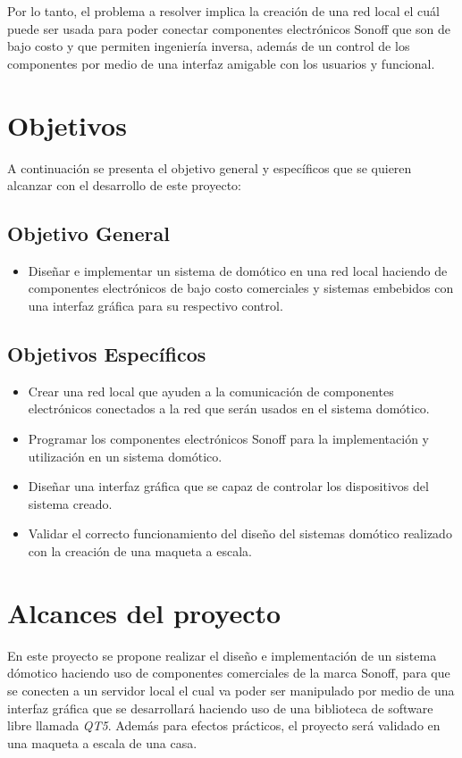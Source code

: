 Por lo tanto, el problema a resolver implica la creación de una red local el cuál puede ser usada para poder conectar componentes electrónicos Sonoff que son de bajo costo y que permiten ingeniería inversa, además de un control de los componentes por medio de una interfaz amigable con los usuarios y funcional.

\section{Objetivos}
A continuación se presenta el objetivo general y específicos que se quieren alcanzar con el desarrollo de este proyecto:

\subsection*{Objetivo General}
\begin{itemize}
\item Diseñar e implementar un sistema de domótico en una red local haciendo de componentes electrónicos de bajo costo comerciales y sistemas embebidos con una interfaz gráfica para su respectivo control.
\end{itemize}
\subsection*{Objetivos Específicos} 
\begin{itemize}
\item Crear una red local que ayuden a la comunicación de componentes electrónicos conectados a la red que serán usados en el sistema domótico.
\item Programar los componentes electrónicos Sonoff para la implementación y utilización en un sistema domótico.
\item Diseñar una interfaz gráfica que se capaz de controlar los dispositivos del sistema creado.
\item Validar el correcto funcionamiento del diseño del sistemas domótico realizado con la creación de una maqueta a escala.
\end{itemize}

\section{Alcances del proyecto}

En este proyecto se propone realizar el diseño e implementación de un sistema dómotico haciendo uso de componentes comerciales de la marca Sonoff, para que se conecten a un servidor local el cual va poder ser manipulado por medio de una interfaz gráfica que se desarrollará haciendo uso de una biblioteca de software libre llamada \textit{QT5}. Además para efectos prácticos, el proyecto será validado en una maqueta a escala de una casa.

